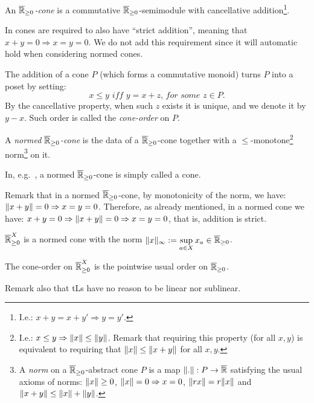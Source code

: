 \begin{definition}
 An \emph{$\overline{\mathbb{R}}_{\geq 0}$-cone} is a commutative $\overline{\mathbb{R}}_{\geq 0}$-semimodule with cancellative addition\footnote{I.e.: $x+y=x+y' \Rightarrow y=y'$.}.
\end{definition}

In \cite{Selinger2004} cones are required to also have ``strict addition'', meaning that $x+y=0 \Rightarrow x=y=0$.
We do not add this requirement since it will automatic hold when considering normed cones.

\begin{remark}
 The addition of a cone $P$ (which forms a commutative monoid) turns $P$ into a poset by setting:
 \[
  x \leq y \textit{ iff } y=x+z \textit{, for some }z\in P.
 \]
 By the cancellative property, when such $z$ exists it is unique, and we denote it by $y-x$.
 Such order is called the \emph{cone-order} on $P$.
\end{remark}

\begin{definition}
 A \emph{normed $\overline{\mathbb{R}}_{\geq 0}$-cone} is the data of a $\overline{\mathbb{R}}_{\geq 0}$-cone together with a $\leq$-monotone\footnote{I.e.: $x\leq y \Rightarrow \lVert x\rVert\leq \lVert y\rVert$. Remark that requiring this property (for all $x,y$) is equivalent to requiring that $\lVert x\rVert\leq \lVert x+y\rVert$ for all $x,y$.} norm\footnote{A \emph{norm} on a $\overline{\mathbb{R}}_{\geq 0}$-abstract cone $P$ is a map $\lVert.\rVert:P\to \overline{\mathbb{R}}$ satisfying the usual axioms of norms:
 $\lVert x\rVert \geq 0$, $\lVert x\rVert = 0 \Rightarrow x=0$, $\lVert rx\rVert=r\lVert x\rVert$ and $\lVert x+y\rVert\leq \lVert x\rVert + \lVert y\rVert$.} on it.
\end{definition}

In, e.g.~\cite{EhrPagTas2018}, a normed $\overline{\mathbb{R}}_{\geq 0}$-cone is simply called a cone.

Remark that in a normed $\overline{\mathbb{R}}_{\geq 0}$-cone, by monotonicity of the norm, we have: $\lVert x+y\rVert=0 \Rightarrow x=y=0$.
Therefore, as already mentioned, in a normed cone we have: 
$x+y=0 \Rightarrow \lVert x+y\rVert=0 \Rightarrow x=y=0$, that is, addition is strict.

\begin{example}
 $\overline{\mathbb{R}}_{\geq 0}^X$ is a normed cone with the norm $\lVert x\rVert_\infty:=\sup\limits_{a\in X} x_a\in \overline{\mathbb{R}}_{\geq 0}$.
\end{example}

\begin{remark}
 The cone-order on $\overline{\mathbb{R}}_{\geq 0}^X$ is the pointwise usual order on $\overline{\mathbb{R}}_{\geq 0}$.
 
 Remark also that tLs have no reason to be linear nor sublinear.
\end{remark}

